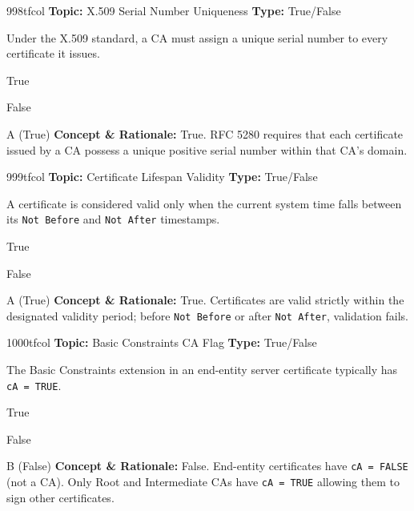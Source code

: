 \begin{qcard}{998}{tfcol}
\textcolor{darkslate!75}{\small\textbf{Topic:} X.509 Serial Number Uniqueness \hfill \textbf{Type:} True/False}\vspace{0.4em}\par
Under the X.509 standard, a CA must assign a unique serial number to every certificate it issues.
\begin{qoptions}
\item True
\item False
\end{qoptions}
\end{qcard}
\nopagebreak
\begin{explainbox}{A (True)}
\textbf{Concept \& Rationale:} True. RFC 5280 requires that each certificate issued by a CA possess a unique positive serial number within that CA's domain.
\end{explainbox}

\begin{qcard}{999}{tfcol}
\textcolor{darkslate!75}{\small\textbf{Topic:} Certificate Lifespan Validity \hfill \textbf{Type:} True/False}\vspace{0.4em}\par
A certificate is considered valid only when the current system time falls between its \texttt{Not Before} and \texttt{Not After} timestamps.
\begin{qoptions}
\item True
\item False
\end{qoptions}
\end{qcard}
\nopagebreak
\begin{explainbox}{A (True)}
\textbf{Concept \& Rationale:} True. Certificates are valid strictly within the designated validity period; before \texttt{Not Before} or after \texttt{Not After}, validation fails.
\end{explainbox}

\begin{qcard}{1000}{tfcol}
\textcolor{darkslate!75}{\small\textbf{Topic:} Basic Constraints CA Flag \hfill \textbf{Type:} True/False}\vspace{0.4em}\par
The Basic Constraints extension in an end-entity server certificate typically has \texttt{cA = TRUE}.
\begin{qoptions}
\item True
\item False
\end{qoptions}
\end{qcard}
\nopagebreak
\begin{explainbox}{B (False)}
\textbf{Concept \& Rationale:} False. End-entity certificates have \texttt{cA = FALSE} (not a CA). Only Root and Intermediate CAs have \texttt{cA = TRUE} allowing them to sign other certificates.
\end{explainbox}

